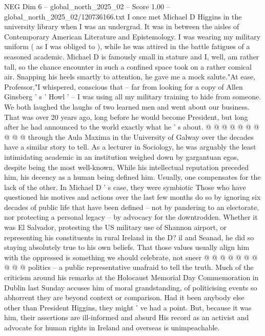 \begin{textsample}{NEG Dim 6 – global\_north\_2025\_02 – Score 1.00 – global\_north\_2025\_02/120736166.txt}  \label{ex:f6_neg_084}
I once met Michael D Higgins in the university library when I was an undergrad.
It was in between the aisles of Contemporary American Literature and Epistemology.
I was wearing my military uniform ( as I was obliged to ), while he was attired in the battle fatigues of a seasoned academic.
Michael D is famously small in stature and I, well, am rather tall, so the chance encounter in such a confined space took on a rather comical air.
Snapping his heels smartly to attention, he gave me a mock salute."At ease, Professor,"I whispered, conscious that -- far from looking for a copy of Allen Ginsberg ' s ' Howl ' -- I was using all my military training to hide from someone.
We both laughed the laughs of two learned men and went about our business.
That was over 20 years ago, long before he would become President, but long after he had announced to the world exactly what he ' s about. @ @ @ @ @ @ @ @ @ @ through the Aula Maxima in the University of Galway over the decades have a similar story to tell.
As a lecturer in Sociology, he was arguably the least intimidating academic in an institution weighed down by gargantuan egos, despite being the most well-known.
While his intellectual reputation preceded him, his decency as a human being defined him.
Usually, one compensates for the lack of the other.
In Michael D ' s case, they were symbiotic Those who have questioned his motives and actions over the last few months do so by ignoring six decades of public life that have been defined -- not by pandering to an electorate, nor protecting a personal legacy -- by advocacy for the downtrodden.
Whether it was El Salvador, protesting the US military use of Shannon airport, or representing his constituents in rural Ireland in the D? il and Seanad, he did so staying absolutely true to his own beliefs.
That those values usually align him with the oppressed is something we should celebrate, not sneer @ @ @ @ @ @ @ @ @ @ politics -- a public representative unafraid to tell the truth.
Much of the criticism around his remarks at the Holocaust Memorial Day Commemoration in Dublin last Sunday accuses him of moral grandstanding, of politicising events so abhorrent they are beyond context or comparison.
Had it been anybody else other than President Higgins, they might ' ve had a point.
But, because it was him, their assertions are ill-informed and absurd His record as an activist and advocate for human rights in Ireland and overseas is unimpeachable.

\end{textsample}

